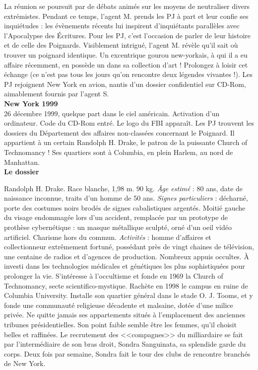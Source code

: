 \documentclass[11pt,twoside,a4paper]{book}
\begin{document}
La r{\'e}union se poursuit par de d{\'e}bats anim{\'e}s sur les moyens de neutraliser divers extr{\'e}mistes. Pendant ce temps, l'agent M. prends les PJ {\`a} part et leur confie ses inqui{\'e}tudes : les {\'e}v{\`e}nements r{\'e}cents lui inspirent d'inqui{\'e}tants parall{\`e}les avec l'Apocalypse des {\'E}critures. Pour les PJ, c'est l'occasion de parler de leur histoire et de celle des Poignards. Visiblement intrigu{\'e}, l'agent M. r{\'e}v{\`e}le qu'il sait o{\`u} trouver un poignard identique. Un excentrique gourou new-yorkais, {\`a} qui il a eu affaire r{\'e}cemment, en poss{\`e}de un dans sa collection d'art ! Prolongez {\`a} loisir cet {\'e}change (ce n'est pas tous les jours qu'on rencontre deux l{\'e}gendes vivantes !). Les PJ rejoignent New York en avion, nantis d'un dossier confidentiel sur CD-Rom, aimablement fournis par l'agent S.~\\

\textbf{\large New York 1999}~\\

26 d{\'e}cembre 1999, quelque part dans le ciel am{\'e}ricain. Activation d'un ordinateur. Code du CD-Rom entr{\'e}. Le logo du FBI appara{\^i}t. Les PJ trouvent les dossiers du D{\'e}partement des affaires non-class{\'e}es concernant le Poignard. Il appartient {\`a} un certain Randolph H. Drake, le patron de la puissante Church of Technomancy ! Ses quartiers sont {\`a} Columbia, en plein Harlem, au nord de Manhattan.~\\

\textbf{Le dossier}%

Randolph H. Drake. Race blanche, 1,98 m. 90 kg. \emph{{\^A}ge estim{\'e}} : 80 ans, date de naissance inconnue, traits d'un homme de 50 ans. \emph{Signes particuliers} : d{\'e}charn{\'e}, porte des costumes noirs brod{\'e}s de signes cabalistiques argent{\'e}s. Moiti{\'e} gauche du visage endommag{\'e}e lors d'un accident, remplac{\'e}e par un prototype de proth{\`e}se cybern{\'e}tique : un masque m{\'e}tallique sculpt{\'e}, orn{\'e} d'un oeil vid{\'e}o artificiel. Charisme hors du commun. \emph{Activit{\'e}s} : homme d'affaires et collectionneur extr{\^e}mement fortun{\'e}, poss{\'e}dant pr{\`e}s de vingt chaines de t{\'e}l{\'e}vision, une centaine de radios et d'agences de production. Nombreux appuis occultes. {\`A} investi dans les technologies m{\'e}dicales et g{\'e}n{\'e}tiques les plus sophistiqu{\'e}es pour prolonger la vie. S'int{\'e}resse {\`a} l'occultisme et fonde en 1969 la Church of Technomancy, secte scientifico-mystique. Rach{\`e}te en 1998 le campus en ruine de Columbia University. Installe son quartier g{\'e}n{\'e}ral dans le stade O. J. Tooms, et y fonde une communaut{\'e} religieuse d{\'e}cadente et malsaine, dot{\'e}e d'une milice priv{\'e}e. Ne quitte jamais ses appartements situ{\'e}s {\`a} l'emplacement des anciennes tribunes pr{\'e}sidentielles. Son point faible semble {\^e}tre les femmes, qu'il choisit belles et raffin{\'e}es. Le recrutement des <<compagnes>> du milliardaire se fait par l'interm{\'e}diaire de son bras droit, Sondra Sanguinata, sa splendide garde du corps. Deux fois par semaine, Sondra fait le tour des clubs de rencontre branch{\'e}s de New York.~\\
\end{document}
